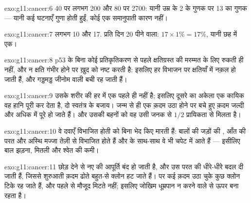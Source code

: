 \begin{solution}{exo:g11:cancer:6}
40 पर लगभग 200 और 80 पर 2700: यानी उम्र के 2 के गुणक पर 13 का गुणक ---
यानी कई घटनाएँ गुणा होती हुईं, कोई एक समानुपाती कारण नहीं।
\end{solution}

\begin{solution}{exo:g11:cancer:7}
लगभग 10 और 17. प्रति दिन 20 पीने वाला: $17 \times 1\% = 17\%$, यानी छह
में एक।
\end{solution}

\begin{solution}{exo:g11:cancer:8}
p53 के बिना कोई  प्रतिकृतिकरण से पहले क्षतिग्रस्त  की मरम्मत के
लिए रुकती ही नहीं, और न क्षति गंभीर होने पर ख़ुद को नष्ट करती है: इसलिए हर
विभाजन पर क्षतियाँ  में नक़ल हो जाती हैं, और गड्डमड्ड जीनोम
वाली  बची रह जाती हैं।
\end{solution}

\begin{solution}{exo:g11:cancer:9}
उसके शरीर की हर  में एक  पहले ही नहीं है; इसलिए दूसरे का
अकेला एक कायिक  वह हानि पूरी कर देता है, दो स्वतंत्र
 के बजाय। जन्म से ही एक क़दम उठा होने पर बचे हुए क़दम जल्दी
और अधिक  में पूरे हो जाते हैं। और उसकी बहनों को वह  उसी जनक
से $1/2$ प्रायिकता से मिलता है।
\end{solution}

\begin{solution}{exo:g11:cancer:10}
वे दवाएँ विभाजित होती  को बिना भेद किए मारती हैं: बालों की जड़ों
की , आँत की परत और अस्थि मज्जा तेज़ी से विभाजित होते हैं और 
के साथ-साथ वे भी चपेट में आते हैं --- इसीलिए बाल झड़ना, मितली और श्वेत
 की कमी।
\end{solution}

\begin{solution}{exo:g11:cancer:11}
छोड़ देने से नए  की आपूर्ति बंद हो जाती है, और उस परत की
 धीरे-धीरे बदल दी जाती हैं, जिससे शुरुआती क़दम ढोते बहुत-से क्लोन
हट जाते हैं। पर कई क़दम उठा चुके कुछ क्लोन टिके रह जाते हैं, और पहले से
मौजूद  मिटते नहीं; इसलिए जोखिम धूम्रपान न करने वाले से ऊपर बना
रहता है।
\end{solution}

